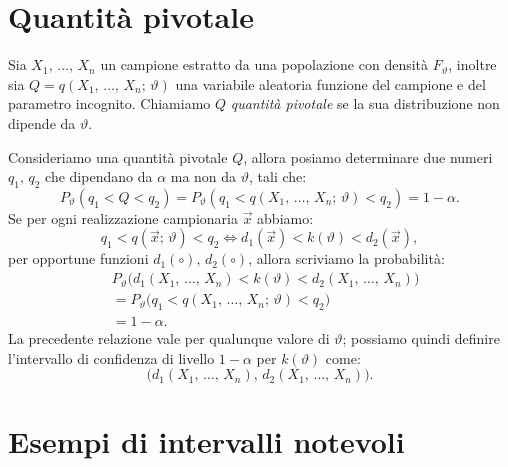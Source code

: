     \section{Quantità pivotale}
        \begin{defn}
            Sia $X_1,\, \ldots,\, X_{n}$ un campione estratto da una popolazione con densità $F_\vartheta$, 
            inoltre sia $Q = q(X_1,\, \ldots,\, X_{n};\, \vartheta)$ una variabile aleatoria funzione del 
            campione e del parametro incognito. Chiamiamo $Q$ \emph{quantità pivotale} se la sua 
            distribuzione non dipende da $\vartheta$.
        \end{defn}
        \begin{obsv}
            Consideriamo una quantità pivotale $Q$, allora posiamo determinare due numeri $q_1,\, q_2$ che 
            dipendano da $\alpha$ ma non da $\vartheta$, tali che: \[
                P_\vartheta(q_1 < Q < q_2) = P_\vartheta(q_1 < q(X_1,\, \ldots,\, X_{n};\, \vartheta) < q_2) 
                = 1-\alpha
            .\] Se per ogni realizzazione campionaria $\vec{x}$ abbiamo: \[
            q_1 < q(\vec{x};\, \vartheta) < q_2 \iff d_1(\vec{x}) < k(\vartheta) < d_2(\vec{x})
        ,\] per opportune funzioni $d_1(\circ),\, d_2(\circ)$, allora scriviamo la probabilità:
        \begin{align*}
            &P_\vartheta\big(d_1(X_1,\, \ldots,\, X_{n}) < k(\vartheta) < d_2(X_1,\, \ldots,\, X_{n})\big) \\
            &= P_\vartheta\big(q_1 < q(X_1,\, \ldots,\, X_{n};\, \vartheta) < q_2\big) \\
            &= 1-\alpha
        .\end{align*}
        La precedente relazione vale per qualunque valore di $\vartheta$; possiamo quindi definire l'intervallo 
        di confidenza di livello $1-\alpha$ per $k(\vartheta)$ come: \[
            \big(d_1(X_1,\, \ldots,\, X_{n}),\, d_2(X_1,\, \ldots,\, X_{n})\big)
        .\]
        \end{obsv}
        \pagebreak %
    \section{Esempi di intervalli notevoli}
